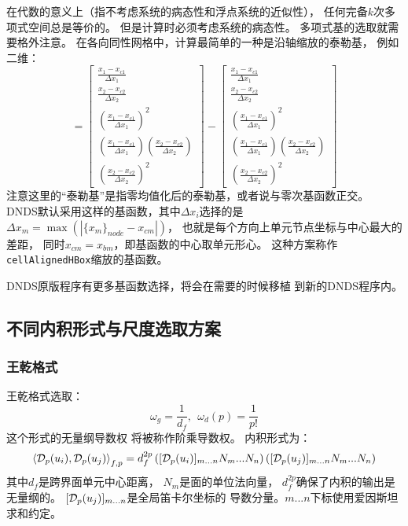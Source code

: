 \documentclass[UTF8,zihao=5]{ctexart} %
\newcommand*{\inc}[0]{{\Delta}}
\newcommand*{\mean}[1]{{#1}}
\begin{document}
在代数的意义上（指不考虑系统的病态性和浮点系统的近似性），
任何完备$k$次多项式空间总是等价的。
但是计算时必须考虑系统的病态性。
多项式基的选取就需要格外注意。
在各向同性网格中，计算最简单的一种是沿轴缩放的泰勒基，
例如二维：
\begin{equation}
    [\phi_i^l] = \begin{bmatrix}
        \frac{x_1-x_{c1}}{\inc x_1}                                \\
        \frac{x_2-x_{c2}}{\inc x_2}                                \\
        (\frac{x_1-x_{c1}}{\inc x_1})^2                            \\
        (\frac{x_1-x_{c1}}{\inc x_1})(\frac{x_2-x_{c2}}{\inc x_2}) \\
        (\frac{x_2-x_{c2}}{\inc x_2})^2
    \end{bmatrix}
    -\mean{
        \begin{bmatrix}
            \frac{x_1-x_{c1}}{\inc x_1}                                \\
            \frac{x_2-x_{c2}}{\inc x_2}                                \\
            (\frac{x_1-x_{c1}}{\inc x_1})^2                            \\
            (\frac{x_1-x_{c1}}{\inc x_1})(\frac{x_2-x_{c2}}{\inc x_2}) \\
            (\frac{x_2-x_{c2}}{\inc x_2})^2
        \end{bmatrix}}
\end{equation}
注意这里的“泰勒基”是指零均值化后的泰勒基，或者说与零次基函数正交。
DNDS默认采用这样的基函数，其中$\inc x_i$选择的是
$\inc x_m = \max(|\{x_m\}_{node}-x_{cm}|)$，
也就是每个方向上单元节点坐标与中心最大的差距，
同时$x_{cm}=x_{bm}$，即基函数的中心取单元形心。
这种方案称作\verb|cellAlignedHBox|缩放的基函数。

DNDS原版程序有更多基函数选择，将会在需要的时候移植
到新的DNDS程序内。

\subsection{不同内积形式与尺度选取方案}

\subsubsection{王乾格式}

王乾格式\cite{wang2017compact3}选取：
$$
    \omega_g = \frac{1}{d_f},\ \ \omega_d(p) =  \frac{1}{p!}
$$
这个形式的无量纲导数权
将被称作阶乘导数权。
内积形式为：
$$
    \left\langle\mathcal{D}_p(u_i),\mathcal{D}_p(u_j)\right\rangle_{f,p}
    =d_f^{2p}
    \left([\mathcal{D}_p(u_i)]_{m...n}N_m... N_n\right)
    \left([\mathcal{D}_p(u_j)]_{m...n}N_m... N_n\right)
$$
其中$d_f$是跨界面单元中心距离，
$N_m$是面的单位法向量，
$d_f^{2p}$确保了内积的输出是无量纲的。
$[\mathcal{D}_p(u_j)]_{m...n}$是全局笛卡尔坐标的
导数分量。$m...n$下标使用爱因斯坦求和约定。
\end{document}
